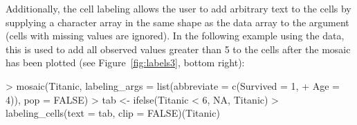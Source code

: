 \documentclass{Z}
\newcommand{\data}[1]{\texttt{#1}}
\begin{document}
\noindent Additionally, the cell labeling allows the user to add
arbitrary text to the cells by supplying a character array in the same
shape as the data array to the  argument (cells with missing values
are ignored). In the following example using the  data, 
this is used to add all observed values greater
than 5 to the cells after the mosaic has been plotted (see
Figure~\ref{fig:labels3}, bottom right):

\begin{Schunk}
\begin{Sinput}
> mosaic(Titanic, labeling_args = list(abbreviate = c(Survived = 1, 
+     Age = 4)), pop = FALSE)
> tab <- ifelse(Titanic < 6, NA, Titanic)
> labeling_cells(text = tab, clip = FALSE)(Titanic)
\end{Sinput}
\end{Schunk}

\end{document}
